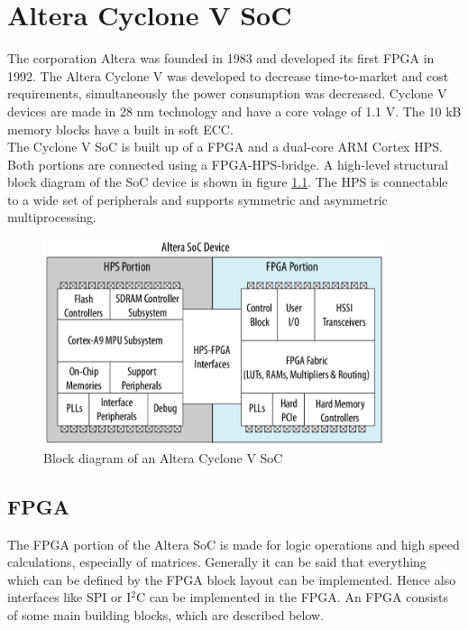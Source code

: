 \chapter{Altera Cyclone V SoC}
\label{kap:alteracyclone}
The corporation Altera was founded in 1983 and developed its first FPGA in 1992.\cite{althist16} The Altera Cyclone V was developed to decrease time-to-market and cost requirements, simultaneously the power consumption was decreased. Cyclone V devices are made in 28 nm technology and have a core volage of 1.1 V. The 10 kB memory blocks have a built in soft ECC.\cite{altcycvov15}\\
The Cyclone V SoC is built up of a FPGA and a dual-core ARM Cortex HPS. Both portions are connected using a FPGA-HPS-bridge. A high-level structural block diagram of the SoC device is shown in figure \ref{fig:alterasocblocks}. The HPS is connectable to a wide set of peripherals and supports symmetric and asymmetric multiprocessing.
\begin{figure}[htbp]
\begin{center}
\includegraphics[width=10cm,keepaspectratio=true]{bilder/png/AlteraSoC}
\caption{Block diagram of an Altera Cyclone V SoC\cite[chapter 1]{AlteraHPS15}}
\label{fig:alterasocblocks}
\end{center}
\end{figure}
\section{FPGA}
The FPGA portion of the Altera SoC is made for logic operations and high speed calculations, especially of matrices. Generally it can be said that everything which can be defined by the FPGA block layout can be implemented. Hence also interfaces like SPI or I$^2$C can be implemented in the FPGA. An FPGA consists of some main building blocks, which are described below.
